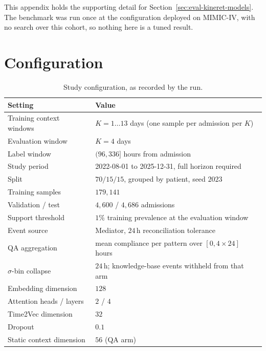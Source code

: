 
This appendix holds the supporting detail for Section~\ref{sec:eval-kineret-models}. The benchmark was run once at the configuration deployed on MIMIC-IV, with no search over this cohort, so nothing here is a tuned result.

\section{Configuration}
\label{app:kineret-config}

\begin{table}[htbp]
\centering
\singlespacing
\caption{Study configuration, as recorded by the run.}
\label{tab:kineret-config}
\small
\begin{tabular}{ll}
\toprule
Setting & Value \\
\midrule
Training context windows   & $K = 1 \ldots 13$ days (one sample per admission per $K$) \\
Evaluation window          & $K = 4$ days \\
Label window               & $(96, 336]$ hours from admission \\
Study period               & 2022-08-01 to 2025-12-31, full horizon required \\
Split                      & $70/15/15$, grouped by patient, seed $2023$ \\
Training samples           & $179{,}141$ \\
Validation / test          & $4{,}600$ / $4{,}686$ admissions \\
Support threshold          & $1\%$ training prevalence at the evaluation window \\
Event source               & Mediator, $24$\,h reconciliation tolerance \\
QA aggregation             & mean compliance per pattern over $[0, 4\times24]$ hours \\
$\sigma$-bin collapse      & $24$\,h; knowledge-base events withheld from that arm \\
\midrule
Embedding dimension        & $128$ \\
Attention heads / layers   & $2$ / $4$ \\
Time2Vec dimension         & $32$ \\
Dropout                    & $0.1$ \\
Static context dimension   & $56$ (QA arm) \\
\bottomrule
\end{tabular}
\end{table}


